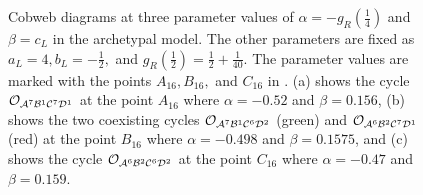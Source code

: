 \begin{figure}
	\centering
	\caption[Cobweb diagrams of the archetypal model]{
		Cobweb diagrams at three parameter values of $\alpha = -g_R\left(\frac{1}{4}\right)$ and $\beta = c_L$ in the archetypal model.
		The other parameters are fixed as $a_L = 4, b_L = -\frac{1}{2},$ and $g_R\left(\frac{1}{2}\right) = \frac{1}{2} + \frac{1}{40}$.
		The parameter values are marked with the points $A_{16}, B_{16},$ and $C_{16}$ in .
		(a) shows the cycle $\mathcal{O}_{\mathcal{A}^7\mathcal{B}^1\mathcal{C}^7\mathcal{D}^1}$ at the point $A_{16}$ where $\alpha = -0.52$ and $\beta = 0.156$,
		(b) shows the two coexisting cycles $\mathcal{O}_{\mathcal{A}^7\mathcal{B}^1\mathcal{C}^6\mathcal{D}^2}$ (green) and $\mathcal{O}_{\mathcal{A}^6\mathcal{B}^2\mathcal{C}^7\mathcal{D}^1}$ (red) at the point $B_{16}$ where $\alpha = -0.498$ and $\beta = 0.1575$,
		and (c) shows the cycle $\mathcal{O}_{\mathcal{A}^6\mathcal{B}^2\mathcal{C}^6\mathcal{D}^2}$ at the point $C_{16}$ where $\alpha = -0.47$ and $\beta = 0.159$.
	}
	\label{fig:arch.dyn.cobwebs.1}
\end{figure}

